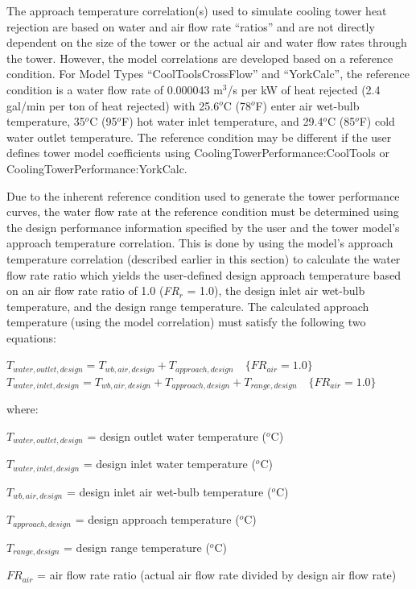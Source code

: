 The approach temperature correlation(s) used to simulate cooling tower heat rejection are based on water and air flow rate ``ratios'' and are not directly dependent on the size of the tower or the actual air and water flow rates through the tower. However, the model correlations are developed based on a reference condition. For Model Types ``CoolToolsCrossFlow'' and ``YorkCalc'', the reference condition is a water flow rate of 0.000043 m\(^{3}\)/s per kW of heat rejected (2.4 gal/min per ton of heat rejected) with 25.6\(^{o}\)C (78\(^{o}\)F) enter air wet-bulb temperature, 35\(^{o}\)C (95\(^{o}\)F) hot water inlet temperature, and 29.4\(^{o}\)C (85\(^{o}\)F) cold water outlet temperature. The reference condition may be different if the user defines tower model coefficients using CoolingTowerPerformance:CoolTools or CoolingTowerPerformance:YorkCalc.

Due to the inherent reference condition used to generate the tower performance curves, the water flow rate at the reference condition must be determined using the design performance information specified by the user and the tower model's approach temperature correlation. This is done by using the model's approach temperature correlation (described earlier in this section) to calculate the water flow rate ratio which yields the user-defined design approach temperature based on an air flow rate ratio of 1.0 (\emph{FR\(_{r}\)} = 1.0), the design inlet air wet-bulb temperature, and the design range temperature. The calculated approach temperature (using the model correlation) must satisfy the following two equations:

\({T_{water,outlet,design}} = {T_{wb,air,design}} + {T_{approach,design}}\quad \{ F{R_{air}} = 1.0\}\) \({T_{water,inlet,design}} = {T_{wb,air,design}} + {T_{approach,design}} + {T_{range,design}}\quad \{ F{R_{air}} = 1.0\}\)

where:

\({T_{water,outlet,design}}\) = design outlet water temperature (\(^{o}\)C)

\({T_{water,inlet,design}}\) = design inlet water temperature (\(^{o}\)C)

\({T_{wb,air,design}}\) = design inlet air wet-bulb temperature (\(^{o}\)C)

\({T_{approach,design}}\) = design approach temperature (\(^{o}\)C)

\({T_{range,design}}\) = design range temperature (\(^{o}\)C)

\(F{R_{air}}\) = air flow rate ratio (actual air flow rate divided by design air flow rate)

